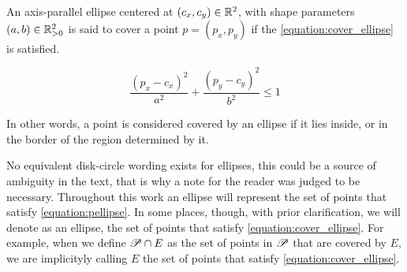 \begin{definicao}
An axis-parallel ellipse centered at $(c_x, c_y) \in \mathbb{R}^2$, with shape parameters $(a,b) \in \mathbb{R}^2_{>0}$ is said to cover a point $p=(p_x,p_y)$ if the \autoref{equation:cover_ellipse} is satisfied.

\begin{equation}\label{equation:cover_ellipse}
    \dfrac{(p_x-c_x)^2}{a^2} + \dfrac{(p_y-c_y)^2}{b^2} \le 1
\end{equation}
\end{definicao}

In other words, a point is considered covered by an ellipse if it lies inside, or in the border of the region determined by it.

No equivalent disk-circle wording exists for ellipses, this could be a source of ambiguity in the text, that is why a note for the reader was judged to be necessary. Throughout this work an ellipse will represent the set of points that satisfy \autoref{equation:pellipse}. In some places, though, with prior clarification, we will denote as an ellipse, the set of points that satisfy \autoref{equation:cover_ellipse}. For example, when we define $\mathscr{P} \cap E$ as the set of points in $\mathscr{P}$ that are covered by $E$, we are implicityly calling $E$ the set of points that satisfy \autoref{equation:cover_ellipse}.